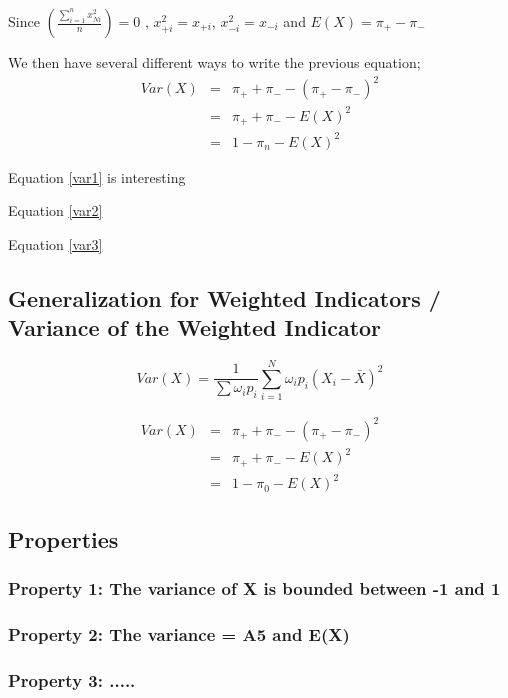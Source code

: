 \documentclass[12pt,a4paper,oneside]{book}
\begin{document}
Since $\left( \frac{\sum_{i=1}^n x_{Ni}^2}{n} \right) = 0$ ,
$x_{+i}^2 = x_{+i}$, $x_{-i}^2 = x_{-i}$
and $E(X) = \pi_+ - \pi_-$


We then have several different ways to write the previous equation;
\begin{eqnarray}
Var(X) &=& \pi_+ + \pi_- - ( \pi_+ - \pi_- )^2 \nonumber \\
	&=& \pi_+ + \pi_- - E ( X )^2 \label{var2} \\
	&=& 1 - \pi_n - E(X)^2 \label{var3}
\end{eqnarray}

Equation \ref{var1} is interesting 

Equation \ref{var2}

Equation \ref{var3}




\subsection{Generalization for Weighted Indicators / Variance of the Weighted Indicator}

\begin{equation}
Var(X) = \frac{1}{\sum \omega_i p_i } \sum^N _{i=1} \omega_i p_i (X_i - \bar{X})^2
\end{equation}


\begin{eqnarray}
Var(X) &=& \pi_+ + \pi_- - ( \pi_+ - \pi_- )^2 \\
	&=& \pi_+ + \pi_- - E ( X )^2 \\
	&=& 1 - \pi_0 - E(X)^2
\end{eqnarray}


\subsection{Properties}

\subsubsection{Property 1: The variance of X is bounded between -1 and 1}

\subsubsection{Property 2: The variance = A5 and E(X)}


\subsubsection{Property 3: .....}
\end{document}
